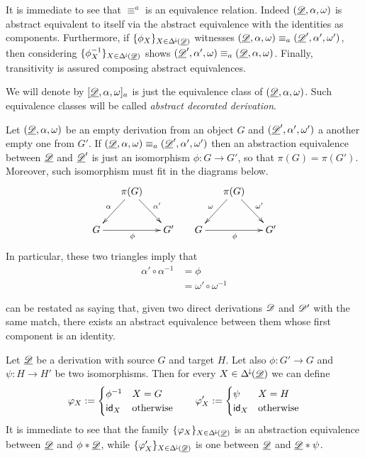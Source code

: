 \begin{remark}\label{rem:equi}
	It is immediate to see that $\equiv^a$ is an equivalence relation. Indeed $(\underline{\mathscr{D}}, \alpha, \omega)$ is abstract equivalent to itself via the abstract equivalence with the identities as components. Furthermore, if  $\{\phi_X\}_{X\in \Delta^{\hspace{-1pt}\downarrow\hspace{-1pt}}(\underline{\mathscr{D}})}$  witnesses $(\underline{\mathscr{D}}, \alpha, \omega)\equiv_a (\underline{\mathscr{D}}', \alpha', \omega')$, then considering $\{\phi^{-1}_X\}_{X\in \Delta^{\hspace{-1pt}\downarrow\hspace{-1pt}}(\underline{\mathscr{D}})}$ shows $(\underline{\mathscr{D}}', \alpha', \omega)\equiv_a (\underline{\mathscr{D}}, \alpha, \omega)$. Finally, transitivity is assured composing abstract equivalences. 
	
	We will denote by $[\underline{\mathscr{D}}, \alpha, \omega]_a$ is just the equivalence class of  $(\underline{\mathscr{D}}, \alpha, \omega)$.
	 Such equivalence classes will be called  \emph{abstract decorated derivation}.  
\end{remark}

\begin{example}\label{rem:empty}
Let $(\underline{\mathscr{D}},\alpha, \omega)$ be an empty derivation from an object $G$ and  $(\underline{\mathscr{D}}',\alpha', \omega')$ a another empty one from $G'$.  If $(\underline{\mathscr{D}},\alpha, \omega)\equiv_a(\underline{\mathscr{D}}',\alpha', \omega')$ then an abstraction equivalence between $\underline{\mathscr{D}}$ and $\underline{\mathscr{D}}'$ is just an isomorphism $\phi\colon G\to G'$, so that $\pi(G)=\pi(G')$. Moreover, such isomorphism must fit in the diagrams below.
\[\xymatrix@C=15pt{&\pi(G) \ar[dr]^{\alpha'} \ar[dl]_{\alpha}&&& \pi(G) \ar[dr]^{\omega'} \ar[dl]_{\omega}\\ G\ar[rr]_{\phi} && G' &G \ar[rr]_{\phi} && G' } \]
In particular, these two triangles imply that
\begin{align*}
	\alpha'\circ \alpha^{-1}&=\phi \\&=\omega'\circ \omega^{-1}
\end{align*}
\end{example}

\begin{remark}\label{rem:res}  can be restated as saying that, given two direct derivations $\mathscr{D}$ and $\mathscr{D'}$ with the same match, there exists an abstract equivalence between them whose first component is an identity.
\end{remark}

\begin{remark}\label{rem:absequi}
	Let $\underline{\mathscr{D}}$ be a derivation with source $G$ and target $H$. Let also $\phi\colon G'\to G$ and $\psi\colon H\to H'$ be two isomorphisms. Then for every $X\in \Delta^{\hspace{-1pt}\downarrow\hspace{-1pt}}(\underline{\mathscr{D}})$ we can define 
	\[\varphi_X:=\begin{cases}
		\phi^{-1} & X=G\\
		\mathsf{id}_{X} & \text{otherwise}
	\end{cases} \qquad \varphi'_X:=\begin{cases}
	\psi & X=H\\
	\mathsf{id}_{X} & \text{otherwise}
	\end{cases}\]
It is immediate to see that the family $\{\varphi_X\}_{X\in \Delta^{\hspace{-1pt}\downarrow\hspace{-1pt}}(\underline{\mathscr{D}})}$ is an abstraction equivalence between $\underline{\mathscr{D}}$ and $\phi *\underline{\mathscr{D}}$, while $\{\varphi'_X\}_{X\in \Delta^{\hspace{-1pt}\downarrow\hspace{-1pt}}(\underline{\mathscr{D}})}$ is one between $\underline{\mathscr{D}}$ and $\underline{\mathscr{D}}*\psi$.
\end{remark}

